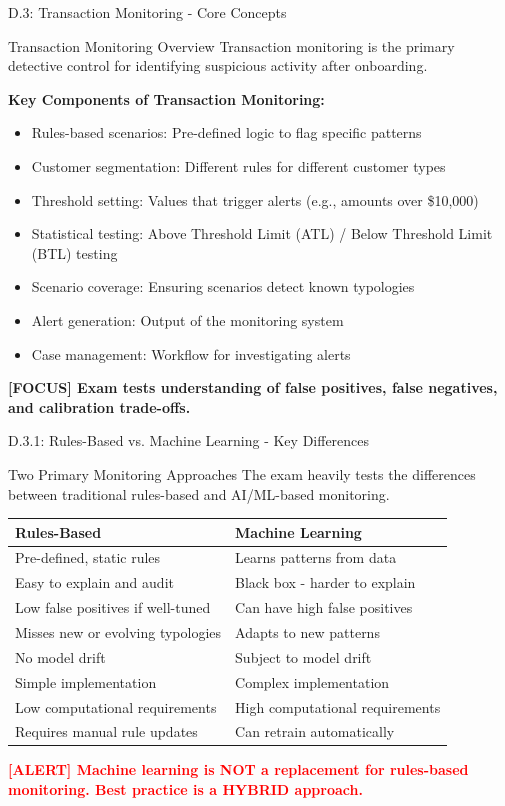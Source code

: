\documentclass[11pt,a4paper]{beamer}
\newcommand{\redflag}[1]{\textcolor{red}{\textbf{[ALERT] #1}}}
\newcommand{\examfocus}[1]{\textcolor{orange!80!black}{\textbf{[FOCUS] #1}}}
\begin{document}
\begin{frame}{D.3: Transaction Monitoring - Core Concepts}
	\begin{block}{Transaction Monitoring Overview}
		Transaction monitoring is the primary detective control for identifying suspicious activity after onboarding.
	\end{block}
	\textbf{Key Components of Transaction Monitoring:}
	\begin{itemize}
		\item Rules-based scenarios: Pre-defined logic to flag specific patterns
		\item Customer segmentation: Different rules for different customer types
		\item Threshold setting: Values that trigger alerts (e.g., amounts over \$10,000)
		\item Statistical testing: Above Threshold Limit (ATL) / Below Threshold Limit (BTL) testing
		\item Scenario coverage: Ensuring scenarios detect known typologies
		\item Alert generation: Output of the monitoring system
		\item Case management: Workflow for investigating alerts
	\end{itemize}
	\examfocus{Exam tests understanding of false positives, false negatives, and calibration trade-offs.}
\end{frame}

\begin{frame}{D.3.1: Rules-Based vs. Machine Learning - Key Differences}
	\begin{block}{Two Primary Monitoring Approaches}
		The exam heavily tests the differences between traditional rules-based and AI/ML-based monitoring.
	\end{block}
	\begin{tabular}{p{}|p{}}
		\hline
		\rowcolor{lightgray}
		\textbf{Rules-Based} & \textbf{Machine Learning} \\
		\hline
		Pre-defined, static rules & Learns patterns from data \\
		Easy to explain and audit & Black box - harder to explain \\
		Low false positives if well-tuned & Can have high false positives \\
		Misses new or evolving typologies & Adapts to new patterns \\
		No model drift & Subject to model drift \\
		Simple implementation & Complex implementation \\
		Low computational requirements & High computational requirements \\
		Requires manual rule updates & Can retrain automatically \\
		\hline
	\end{tabular}
	\vspace{0.2cm}
	\redflag{Machine learning is NOT a replacement for rules-based monitoring. Best practice is a HYBRID approach.}
\end{frame}
\end{document}
